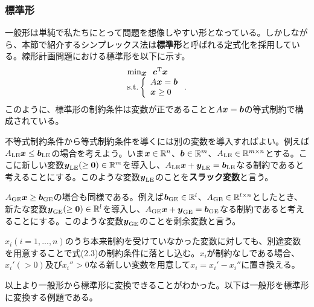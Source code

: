 \documentclass[dvipdfmx, 9pt, a4paper]{jsarticle}
\numberwithin{equation}{section}
\newcommand{\bm}[1]{{\mbox{\boldmath $#1$}}}
\begin{document}
\subsubsection{標準形}
一般形は単純で私たちにとって問題を想像しやすい形となっている。しかしながら、本節で紹介するシンプレックス法は{\bf 標準形}と呼ばれる定式化を採用している。線形計画問題における標準形を以下に示す。
\begin{equation}
\begin{array}{l}
{\rm min}_{\bm x}~~\bm c^{\rm T}\bm x \\
{\rm s.t.}\left\{
\begin{array}{l}
A\bm x = \bm b \\
\bm x \geq 0
\end{array}
\right. .
\end{array}
\end{equation}
このように、標準形の制約条件は変数が正であることと$A\bm x=\bm b$の等式制約で構成されている。\par
不等式制約条件から等式制約条件を導くには別の変数を導入すればよい。例えば$A_{\rm LE}\bm x \leq \bm b_{\rm LE}$の場合を考えよう。いま$\bm x \in \mathbb{R}^n$、$\bm b \in \mathbb{R}^m$、$A_{\rm LE} \in \mathbb{R}^{m \times n}$とする。ここに新しい変数$\bm y_{\rm LE}(\geq \bm 0) \in \mathbb{R}^m$を導入し、$A_{\rm LE}\bm x + \bm y_{\rm LE} = \bm b_{\rm LE}$なる制約であると考えることにする。このような変数$\bm y_{\rm LE}$のことを{\bf スラック変数}と言う。\par
$A_{\rm GE}\bm x \geq \bm b_{\rm GE}$の場合も同様である。例えば$\bm b_{\rm GE} \in \mathbb{R}^l$、$A_{\rm GE} \in \mathbb{R}^{l \times n}$としたとき、新たな変数$\bm y_{\rm GE}(\geq \bm 0) \in \mathbb{R}^l$を導入し、$A_{\rm GE}\bm x + \bm y_{\rm GE} = \bm b_{\rm GE}$なる制約であると考えることにする。このような変数$\bm y_{\rm GE}$のことを剰余変数と言う。\par
$x_i(i=1,...,n)$のうち本来制約を受けていなかった変数に対しても、別途変数を用意することで式(2.3)の制約条件に落とし込む。$x_i$が制約なしである場合、$x_i'(>0)$及び$x_i''>0$なる新しい変数を用意して$x_i=x_i'-x_i''$に置き換える。\par
以上より一般形から標準形に変換できることがわかった。以下は一般形を標準形に変換する例題である。
\end{document}
